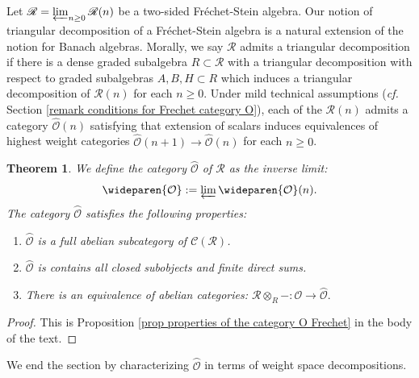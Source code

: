 \documentclass{amsart}
\newtheorem{intteo}{Theorem}
\newcommand{\OX}{\mathcal{O}}
\begin{document}
Let 
    $\mathscr{R}=\varprojlim_{n\geq 0}\mathscr{R}(n)$ be a two-sided Fréchet-Stein algebra. Our notion of triangular decomposition of a Fréchet-Stein algebra is a natural extension of the notion for Banach algebras. Morally, we say $\mathscr{R}$ admits a triangular decomposition if there is a dense graded subalgebra $R\subset \mathscr{R}$ with a triangular decomposition with respect to graded subalgebras $A,B,H\subset R$ which induces a triangular decomposition of $\mathscr{R}(n)$ for each $n\geq 0$. Under mild technical assumptions (\emph{cf.} Section \ref{remark conditions for Frechet category O}), each of the $\mathscr{R}(n)$ admits a category  $\widehat{\OX}(n)$ satisfying that extension of scalars induces equivalences of highest weight categories $\widehat{\OX}(n+1)\rightarrow \widehat{\OX}(n)$ for each $n\geq 0$.
\begin{intteo}
We define the category $\wideparen{\OX}$ of $\mathscr{R}$ as the inverse limit:
\begin{equation*}
    \wideparen{\OX}:=\varprojlim\wideparen{\OX}(n).
\end{equation*}
The category $\wideparen{\OX}$ satisfies the following properties:
\begin{enumerate}[label=(\roman*)]
    \item $\wideparen{\OX}$ is a full abelian subcategory of $\mathcal{C}(\mathscr{R})$.
    \item $\wideparen{\OX}$ is contains all closed subobjects and finite direct sums.
    \item There is an equivalence of abelian categories: $\mathscr{R}\otimes_R-:\OX\rightarrow \wideparen{\OX}.$
\end{enumerate}
\end{intteo}
\begin{proof}
This is Proposition \ref{prop properties of the category O Frechet} in the body of the text.
\end{proof}
We end the section by characterizing $\wideparen{\OX}$ in terms of weight space decompositions.\bigskip
\end{document}
